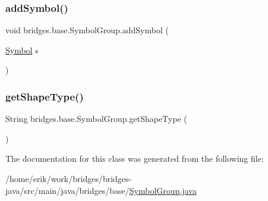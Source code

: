 \subsubsection{\texorpdfstring{add\+Symbol()}{addSymbol()}}
{\footnotesize\ttfamily void bridges.\+base.\+Symbol\+Group.\+add\+Symbol (\begin{DoxyParamCaption}\item[{\hyperlink{classbridges_1_1base_1_1_symbol}{Symbol}}]{s }\end{DoxyParamCaption})}

\mbox{\label{classbridges_1_1base_1_1_symbol_group_a93c41b2ec53ed4dbfcc532cf61bea732}} 
\subsubsection{\texorpdfstring{get\+Shape\+Type()}{getShapeType()}}
{\footnotesize\ttfamily String bridges.\+base.\+Symbol\+Group.\+get\+Shape\+Type (\begin{DoxyParamCaption}{ }\end{DoxyParamCaption})}



The documentation for this class was generated from the following file\+:\begin{DoxyCompactItemize}
\item 
/home/erik/work/bridges/bridges-\/java/src/main/java/bridges/base/\hyperlink{_symbol_group_8java}{Symbol\+Group.\+java}\end{DoxyCompactItemize}
